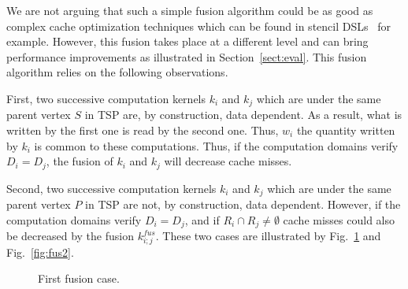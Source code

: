 We are not arguing that such a simple fusion algorithm could be as good as complex cache optimization techniques which can be found in stencil DSLs~\cite{spaaTangCKLL11} for example. However, this fusion takes place at a different level and can bring performance improvements as  illustrated in Section~\ref{sect:eval}. This fusion algorithm relies on the following observations.

First, two successive computation kernels $k_i$ and $k_j$ which are under the same parent vertex $S$ in TSP are, by construction, data dependent. As a result, what is written by the first one is read by the second one. Thus, $w_i$ the quantity written by $k_i$ is common to these computations. Thus, if the computation domains verify $D_i=D_j$, the fusion of $k_i$ and $k_j$ will decrease cache misses.

Second, two successive computation kernels $k_i$ and $k_j$ which are under the same parent vertex $P$ in TSP are not, by construction, data dependent. However, if the computation domains verify $D_i=D_j$, and if $R_i \cap R_j \neq \emptyset$ cache misses could also be decreased by the fusion $k_{i;j}^{fus}$.
These two cases are illustrated by Fig.~\ref{fig:fus1} and Fig.~\ref{fig:fus2}.

\begin{figure}[h!]
\begin{center}
\caption{First fusion case.}
\label{fig:fus1}
\end{center}
\end{figure}

